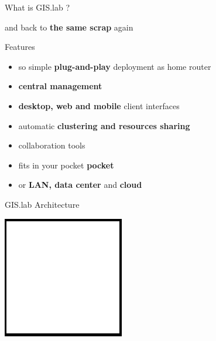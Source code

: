 \documentclass[12pt]{beamer}
\begin{document}
\begin{frame}{What is GIS.lab ?}
	\begin{center}
		and back to \textbf{the same scrap} again
	\end{center}
\end{frame}

\begin{frame}{Features}
	\begin{itemize}[<+->]
		\item so simple \textbf{plug-and-play} deployment as home router
		\item \textbf{central management}
		\item \textbf{desktop, web and mobile} client interfaces
		\item automatic \textbf{clustering and resources sharing}
		\item collaboration tools
		\item fits in your pocket \textbf{pocket}
		\item or \textbf{LAN, data center} and \textbf{cloud}
	\end{itemize}
\end{frame}

\begin{frame}{GIS.lab Architecture}
	\begin{center}
		\includegraphics[keepaspectratio=true,height=0.5\textheight]{images/image.png}
	\end{center}
\end{frame}
\end{document}
